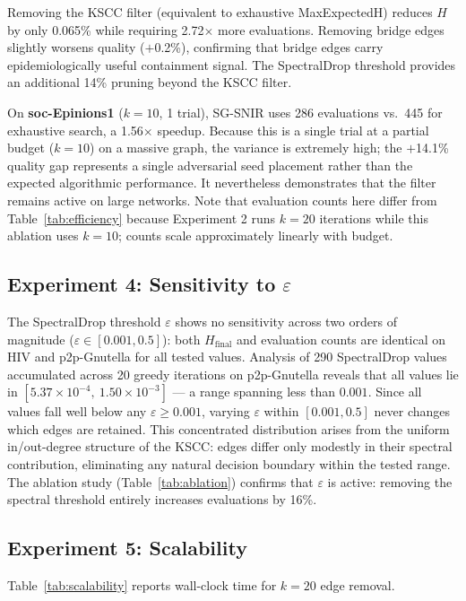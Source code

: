 \documentclass[conference]{IEEEtran}
\begin{document}
Removing the KSCC filter (equivalent to exhaustive MaxExpectedH) reduces $H$ by only 0.065\% while requiring 2.72$\times$ more evaluations. Removing bridge edges slightly worsens quality ($+$0.2\%), confirming that bridge edges carry epidemiologically useful containment signal. The SpectralDrop threshold provides an additional 14\% pruning beyond the KSCC filter.

On \textbf{soc-Epinions1} ($k=10$, 1 trial), SG-SNIR uses 286 evaluations vs.\ 445 for exhaustive search, a 1.56$\times$ speedup. Because this is a single trial at a partial budget ($k=10$) on a massive graph, the variance is extremely high; the $+$14.1\% quality gap represents a single adversarial seed placement rather than the expected algorithmic performance. It nevertheless demonstrates that the filter remains active on large networks. Note that evaluation counts here differ from Table~\ref{tab:efficiency} because Experiment 2 runs $k=20$ iterations while this ablation uses $k=10$; counts scale approximately linearly with budget.

\subsection{Experiment 4: Sensitivity to $\varepsilon$}

The SpectralDrop threshold $\varepsilon$ shows no sensitivity across two orders of magnitude ($\varepsilon \in [0.001, 0.5]$): both $H_{\text{final}}$ and evaluation counts are identical on HIV and p2p-Gnutella for all tested values. Analysis of 290 SpectralDrop values accumulated across 20 greedy iterations on p2p-Gnutella reveals that all values lie in $[5.37 \times 10^{-4},\ 1.50 \times 10^{-3}]$ --- a range spanning less than $0.001$. Since all values fall well below any $\varepsilon \geq 0.001$, varying $\varepsilon$ within $[0.001, 0.5]$ never changes which edges are retained. This concentrated distribution arises from the uniform in/out-degree structure of the KSCC: edges differ only modestly in their spectral contribution, eliminating any natural decision boundary within the tested range. The ablation study (Table~\ref{tab:ablation}) confirms that $\varepsilon$ is active: removing the spectral threshold entirely increases evaluations by 16\%.

\subsection{Experiment 5: Scalability}

Table~\ref{tab:scalability} reports wall-clock time for $k=20$ edge removal.
\end{document}
